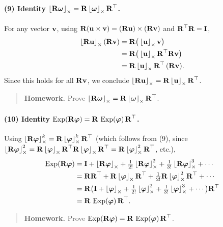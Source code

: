 \paragraph{(9) Identity $\skewsym{\vect{R}\vect{\omega}} = \vect{R}\skewsym{\vect{\omega}}\vect{R}\trans$.} For any vector $\vect{v}$, using $\vect{R}(\vect{u}\times\vect{v}) = (\vect{R}\vect{u})\times(\vect{R}\vect{v})$ and $\vect{R}\trans\vect{R}=\vect{I}$,
\begin{align}
\skewsym{\vect{R}\vect{u}}(\vect{R}\vect{v})
&= \vect{R}\big(\skewsym{\vect{u}}\vect{v}\big) \\
&= \vect{R}\big(\skewsym{\vect{u}}\vect{R}\trans\vect{R}\vect{v}\big) \\
&= \vect{R}\skewsym{\vect{u}}\vect{R}\trans\,(\vect{R}\vect{v}).
\end{align}
Since this holds for all $\vect{R}\vect{v}$, we conclude $\skewsym{\vect{R}\vect{u}} = \vect{R}\skewsym{\vect{u}}\vect{R}\trans$.
\begin{quote}
\textbf{Homework.} Prove $\skewsym{\vect{R}\vect{\omega}} = \vect{R}\skewsym{\vect{\omega}}\vect{R}\trans$.
\end{quote}

\paragraph{(10) Identity $\Exp(\vect{R}\vect{\varphi}) = \vect{R}\,\Exp(\vect{\varphi})\,\vect{R}\trans$.} Using $\skewsym{\vect{R}\vect{\varphi}}^{k} = \vect{R}\skewsym{\vect{\varphi}}^{k}\vect{R}\trans$ (which follows from (9), since $\skewsym{\vect{R}\vect{\varphi}}^{2} = \vect{R}\skewsym{\vect{\varphi}}\vect{R}\trans\vect{R}\skewsym{\vect{\varphi}}\vect{R}\trans = \vect{R}\skewsym{\vect{\varphi}}^{2}\vect{R}\trans$, etc.),
\begin{align}
\Exp(\vect{R}\vect{\varphi})
&= \vect{I} + \skewsym{\vect{R}\vect{\varphi}} + \tfrac{1}{2!}\skewsym{\vect{R}\vect{\varphi}}^{2} + \tfrac{1}{3!}\skewsym{\vect{R}\vect{\varphi}}^{3} + \cdots \notag\\
&= \vect{R}\vect{R}\trans + \vect{R}\skewsym{\vect{\varphi}}\vect{R}\trans + \tfrac{1}{2!}\vect{R}\skewsym{\vect{\varphi}}^{2}\vect{R}\trans + \cdots \notag\\
&= \vect{R}\big(\vect{I} + \skewsym{\vect{\varphi}} + \tfrac{1}{2!}\skewsym{\vect{\varphi}}^{2} + \tfrac{1}{3!}\skewsym{\vect{\varphi}}^{3} + \cdots\big)\vect{R}\trans \\
&= \vect{R}\,\Exp(\vect{\varphi})\,\vect{R}\trans.
\end{align}
\begin{quote}
\textbf{Homework.} Prove $\Exp(\vect{R}\vect{\varphi}) = \vect{R}\,\Exp(\vect{\varphi})\,\vect{R}\trans$.
\end{quote}

